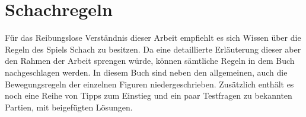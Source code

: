 \section{Schachregeln}
Für das Reibungslose Verständnis dieser Arbeit empfiehlt es sich Wissen über die Regeln des Spiels Schach zu besitzen. Da eine detaillierte Erläuterung dieser aber den Rahmen der Arbeit sprengen würde, können sämtliche Regeln in dem Buch \cite{learnChess} nachgeschlagen werden. In diesem Buch sind neben den allgemeinen, auch die Bewegungsregeln der einzelnen Figuren niedergeschrieben. Zusätzlich enthält es noch eine Reihe von Tipps zum Einstieg und ein paar Testfragen zu bekannten Partien, mit beigefügten Lösungen.